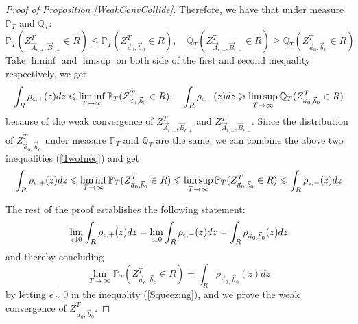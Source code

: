 \begin{proof}[Proof of Proposition \ref{WeakConvCollide}]
Therefore, we have that under measure $\mathbb{P}_{T}$ and $\mathbb{Q}_{T}$:
$$\mathbb{P}_{T}(Z^{T}_{\vec{A}_{\epsilon,+},\vec{B}_{\epsilon,+}}\in R)\leqslant \mathbb{P}_{T}(Z^{T}_{\vec{a}_{0},\vec{b}_{0}}\in R),\quad \mathbb{Q}_{T}(Z^{T}_{\vec{A}_{\epsilon,-},\vec{B}_{\epsilon,-}}\in R)\geqslant \mathbb{Q}_{T}(Z^{T}_{\vec{a}_{0},\vec{b}_{0}}\in R)$$
Take $\liminf$ and $\limsup$ on both side of the first and second inequality respectively, we get
\begin{align}{\label{TwoIneq}}
\int_{R}\rho_{\epsilon,+}(z)dz\leqslant \liminf_{T\rightarrow\infty}\mathbb{P}_{T}(Z^{T}_{\vec{a}_{0},\vec{b}_{0}}\in R),\quad \int_{R}\rho_{\epsilon,-}(z)dz\geqslant \limsup_{T\rightarrow\infty}\mathbb{Q}_{T}(Z^{T}_{\vec{a}_{0},\vec{b}_{0}}\in R)
\end{align}
because of the weak convergence of $Z^{T}_{\vec{A}_{\epsilon,+},\vec{B}_{\epsilon,+}}$ and $Z^{T}_{\vec{A}_{\epsilon,-},\vec{B}_{\epsilon,-}}$. Since the distribution of $Z^{T}_{\vec{a}_{0},\vec{b}_{0}}$ under measure $\mathbb{P}_{T}$ and $\mathbb{Q}_{T}$ are the same, we can combine the above two inequalities (\ref{TwoIneq}) and get
\begin{align}{\label{Squeezing}}
\int_{R}\rho_{\epsilon,+}(z)dz\leqslant \liminf_{T\rightarrow\infty}\mathbb{P}_{T}(Z^{T}_{\vec{a}_{0},\vec{b}_{0}}\in R)\leqslant\limsup_{T\rightarrow\infty}\mathbb{P}_{T}(Z^{T}_{\vec{a}_{0},\vec{b}_{0}}\in R)\leqslant\int_{R}\rho_{\epsilon,-}(z)dz	
\end{align}

The rest of the proof establishes the following statement:
\begin{align}{\label{WeakConvConclude}}
\lim_{\epsilon\downarrow 0}\int_{R}\rho_{\epsilon,+}(z)dz=\lim_{\epsilon\downarrow 0}\int_{R}\rho_{\epsilon,-}(z)dz=\int_{R}\rho_{\vec{a}_{0},\vec{b}_{0}}(z)dz
\end{align}
and thereby concluding $$\lim_{T\rightarrow\infty}\mathbb{P}_{T}(Z^{T}_{\vec{a}_{0},\vec{b}_{0}}\in R)=\int_{R}\rho_{\vec{a}_{0},\vec{b}_{0}}(z)dz$$ by letting $\epsilon\downarrow 0$ in the inequality (\ref{Squeezing}), and we prove the weak convergence of $Z^{T}_{\vec{a}_{0},\vec{b}_{0}}$.


\end{proof}
